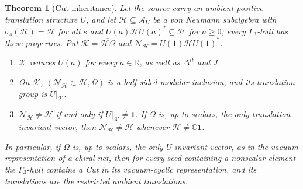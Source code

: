 \documentclass[12pt]{article}
\newtheorem{theorem}{Theorem}[section]
\theoremstyle{definition}
\theoremstyle{remark}
\newcommand{\AU}{\mathcal A_U}
\begin{document}
\begin{theorem}[Cut inheritance]\label{thm:cut}
Let the source carry an ambient positive translation structure \(U\), and let \(\mathcal H\subseteq\AU\) be a von
Neumann subalgebra with \(\sigma_s(\mathcal H)=\mathcal H\) for all \(s\) and
\(U(a)\mathcal HU(a)^*\subseteq\mathcal H\) for \(a\ge0\); every \(\Gamma_3\)-hull has
these properties. Put \(\mathcal K=\overline{\mathcal H\Omega}\) and
\(\mathcal N_{\mathcal H}=U(1)\mathcal HU(1)^*\).
\begin{enumerate}[label=(\alph*),leftmargin=2em]
\item \(\mathcal K\) reduces \(U(a)\) for every \(a\in\mathbb R\), as well as
  \(\Delta^{it}\) and \(J\).
\item On \(\mathcal K\), \((\mathcal N_{\mathcal H}\subset\mathcal H,\Omega)\) is a
  half-sided modular inclusion, and its translation group is \(U|_{\mathcal K}\).
\item \(\mathcal N_{\mathcal H}\neq\mathcal H\) if and only if \(U|_{\mathcal K}\neq\mathbf 1\).
  If \(\Omega\) is, up to scalars, the only translation-invariant vector, then
  \(\mathcal N_{\mathcal H}\neq\mathcal H\) whenever \(\mathcal H\neq\mathbb C\mathbf 1\).
\end{enumerate}
In particular, if \(\Omega\) is, up to scalars, the only \(U\)-invariant vector, as in the vacuum representation of a chiral net, then for every seed containing a nonscalar element the \(\Gamma_3\)-hull
contains a Cut in its vacuum-cyclic representation, and its translations are the
restricted ambient translations.
\end{theorem}
\end{document}
